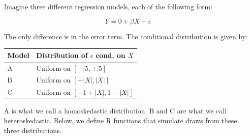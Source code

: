 \documentclass[
  letterpaper,
  DIV=11,
  numbers=noendperiod]{scrreprt}
\begin{document}
Imagine three different regression models, each of the following form:

\[
  Y = 0 + \beta X + \epsilon
\]

The only difference is in the error term. The conditional distribution
is given by:

\begin{longtable}[]{@{}ll@{}}
\toprule\noalign{}
Model & Distribution of \(\epsilon\) cond. on \(X\) \\
\midrule\noalign{}
\endhead
\bottomrule\noalign{}
\endlastfoot
A & Uniform on \([-.5, +.5]\) \\
B & Uniform on \([ - |X|, |X| ]\) \\
C & Uniform on \([ -1 + |X|, 1- |X| ]\) \\
\end{longtable}

A is what we call a homoskedastic distribution. B and C are what we call
heteroskedastic. Below, we define R functions that simulate draws from
these three distributions.
\end{document}
